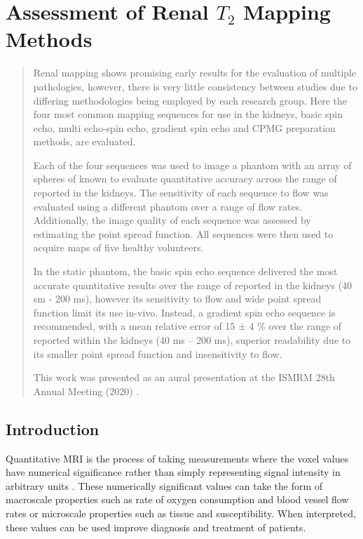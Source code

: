 \chapter{Assessment of Renal $T_2$ Mapping Methods}
\label{chap:t2_mapping}
\newpage
\begin{abstract}
	Renal \ttwo mapping shows promising early results for the evaluation of multiple pathologies, however, there is very little consistency between studies due to differing methodologies being employed by each research group. Here the four most common \ttwo mapping sequences for use in the kidneys, basic spin echo, multi echo-spin echo, gradient spin echo and \ac{CPMG} \ttwo preparation methods, are evaluated.
	
	Each of the four sequences was used to image a phantom with an array of spheres of known \ttwo to evaluate quantitative accuracy across the range of \ttwo reported in the kidneys. The sensitivity of each sequence to flow was evaluated using a different phantom over a range of flow rates. Additionally, the image quality of each sequence was assessed by estimating the point spread function. All sequences were then used to acquire \ttwo maps of five healthy volunteers. 
	
	In the static phantom, the basic spin echo sequence delivered the most accurate quantitative results over the range of \ttwo reported in the kidneys (40 sm - 200 ms), however its sensitivity to flow and wide point spread function limit its use in-vivo. Instead, a gradient spin echo sequence is recommended, with a mean relative error of 15 ± 4 \% over the range of \ttwo reported within the kidneys (40 ms – 200 ms), superior readability due to its smaller point spread function and insensitivity to flow.
	
	This work was presented as an aural presentation at the \ac{ISMRM} 28th Annual Meeting (2020) \cite{daniel_comparison_2020}.
	
\end{abstract}
\newpage
\acresetall

\section{Introduction}
\label{sec:t2_intro}
Quantitative \ac{MRI} is the process of taking measurements where the voxel values have numerical significance rather than simply representing signal intensity in arbitrary units \cite{tofts_quantitative_2003}. These numerically significant values can take the form of macroscale properties such as rate of oxygen consumption and blood vessel flow rates or microscale properties such as tissue \tone and susceptibility. When interpreted, these values can be used improve diagnosis and treatment of patients.

